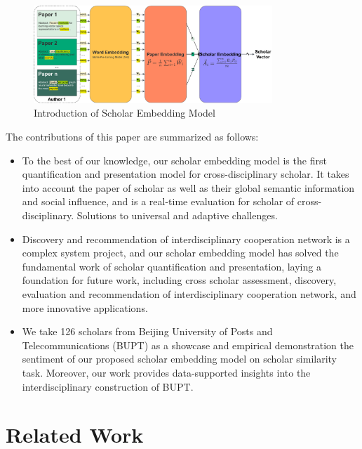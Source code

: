 \documentclass[conference]{IEEEtran}
\begin{document}
\begin{figure}[htbp] %
\centering %
\includegraphics[width=9cm]{img/intro.pdf}
\caption{Introduction of Scholar Embedding Model} %
\label{intro} %
\end{figure}

The contributions of this paper are summarized as follows:

\begin{itemize}
\item
  To the best of our knowledge, our scholar embedding model is the first
  quantification and presentation model for cross-disciplinary scholar.
  It takes into account the paper of scholar as well as their global
  semantic information and social influence, and is a real-time
  evaluation for scholar of cross-disciplinary. Solutions to universal
  and adaptive challenges.
\item
  Discovery and recommendation of interdisciplinary cooperation network
  is a complex system project, and our scholar embedding model has solved
  the fundamental work of scholar quantification and presentation, laying
  a foundation for future work, including cross scholar assessment,
  discovery, evaluation and recommendation of interdisciplinary
  cooperation network, and more innovative applications.
\item
 We take 126 scholars from Beijing University of Posts and Telecommunications (BUPT) as a showcase
  and empirical demonstration the sentiment of our
  proposed scholar embedding model on scholar similarity task. Moreover,
  our work provides data-supported insights into the interdisciplinary
  construction of BUPT.
\end{itemize}









\section{Related Work}
\end{document}
